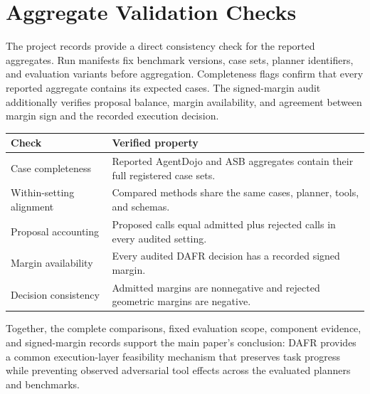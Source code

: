 \documentclass[letterpaper]{article}
\begin{document}
\section{Aggregate Validation Checks}

The project records provide a direct consistency check for the reported aggregates. Run manifests fix benchmark versions, case sets, planner identifiers, and evaluation variants before aggregation. Completeness flags confirm that every reported aggregate contains its expected cases. The signed-margin audit additionally verifies proposal balance, margin availability, and agreement between margin sign and the recorded execution decision.

\begin{center}
\small
\begin{tabular}{>{\raggedright\arraybackslash}p{}>{\raggedright\arraybackslash}p{}}
\toprule
Check & Verified property\\
\midrule
Case completeness & Reported AgentDojo and ASB aggregates contain their full registered case sets.\\
Within-setting alignment & Compared methods share the same cases, planner, tools, and schemas.\\
Proposal accounting & Proposed calls equal admitted plus rejected calls in every audited setting.\\
Margin availability & Every audited DAFR decision has a recorded signed margin.\\
Decision consistency & Admitted margins are nonnegative and rejected geometric margins are negative.\\
\bottomrule
\end{tabular}
\label{tab:validation}
\end{center}

Together, the complete comparisons, fixed evaluation scope, component evidence, and signed-margin records support the main paper's conclusion: DAFR provides a common execution-layer feasibility mechanism that preserves task progress while preventing observed adversarial tool effects across the evaluated planners and benchmarks.
\end{document}
